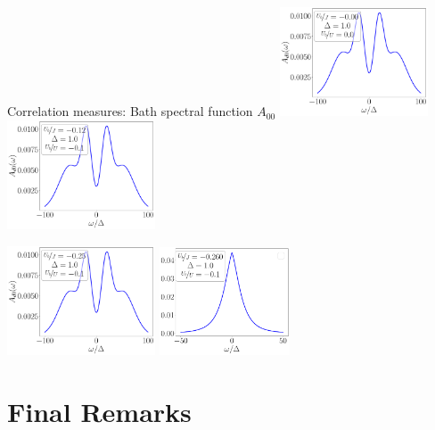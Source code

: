 \documentclass[aspectratio=169]{beamer}
\begin{document}
\begin{frame}[noframenumbering]{Correlation measures: Bath spectral function \(A_{00}\)}
\centering
\hspace*{\fill}
\includegraphics[width=0.33\textwidth]{./figures/spec_func_00_Ub_by_J=-0.000.pdf}
\hspace*{\fill}
\includegraphics[width=0.33\textwidth]{./figures/spec_func_00_Ub_by_J=-0.125.pdf}
\hspace*{\fill}

\hspace*{\fill}
\includegraphics[width=0.33\textwidth]{./figures/spec_func_00_Ub_by_J=-0.250.pdf}
\hspace*{\fill}
\includegraphics[width=0.29\textwidth]{./figures/spec_func_00_Ub_by_J=-0.26.pdf}
\hspace*{\fill}
\end{frame}

\section{Final Remarks}
\label{concl}
\end{document}
